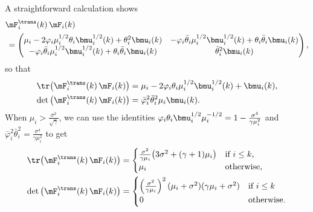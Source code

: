 A straightforward calculation shows
\[
    \begin{split}
    &\mF_i^\trans(k) \, \mF_i(k) \\
        &\,=
        \left(
        \begin{matrix}
            \mu_i 
            - 2 \varphi_i \mu_i^{1/2} \theta_i \bmu_i^{1/2}(k) 
            + \theta_i^2 \bmu_i(k) &
                - \varphi_i \bar \theta_i \mu_i^{1/2} \bmu_i^{1/2}(k)
                + \theta_i \bar \theta_i \bmu_i(k) \\
            - \varphi_i \bar \theta_i \mu_i^{1/2} \bmu_i^{1/2}(k)
            + \theta_i \bar \theta_i \bmu_i(k) &
                \bar \theta_i^2 \bmu_i(k)
        \end{matrix}
        \right),
    \end{split}
\]
so that
\begin{align*}
    \tr \big( \mF_i^\trans(k) \, \mF_i(k) \big)
        &= \mu_i 
           - 2 \varphi_i \theta_i \mu_i^{1/2} \bmu_i^{1/2} (k) 
           + \bmu_i(k), \\
    \det \big( \mF_i^\trans(k) \, \mF_i(k) \big)
        &= \bar \varphi_i^2 \bar \theta_i^2 \mu_i \bmu_i(k).
\end{align*}
When $\mu_i > \frac{\sigma^2}{\sqrt{\gamma}}$, we can use the identities
\(
    \varphi_i \theta_i \bmu_i^{1/2} \mu_i^{-1/2}
    =
    1
    -
    \frac{\sigma^4}{\gamma \mu_i^2}
\)
and
\(
    \bar \varphi_i^2 \bar \theta_i^2
    =
    \frac{\sigma^4}{\gamma \mu_i^2}
\)
to get
\begin{align*}
    \tr \big( \mF_i^\trans(k) \, \mF_i(k) \big)
        &=
            \begin{cases}
                \frac{\sigma^2}{\gamma \mu_i}
                \big(
                    3 \sigma^2 + (\gamma+1) \mu_i
                \big)
                    &\text{if $i \leq k$,} \\
                \mu_i
                    &\text{otherwise,}
            \end{cases} \\
    \det \big( \mF_i^\trans(k) \, \mF_i(k) \big)
        &=
            \begin{cases}
                \left(
                    \frac{\sigma^2}{\gamma \mu_i}
                \right)^2
                (\mu_i + \sigma^2)
                (\gamma \mu_i + \sigma^2)
                    &\text{if $i \leq k$} \\
                0
                    &\text{otherwise.}
            \end{cases}
\end{align*}
